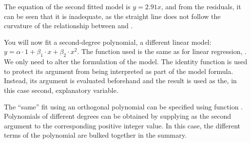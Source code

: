 \documentclass[krantz2]{krantz}\usepackage{knitr}
\begin{document}
The equation of the second fitted model is $y = 2.91 x$, and from the residuals, it can be seen that it is inadequate, as the straight line does not follow the curvature of the relationship between  and .
\begin{playground}
You will now fit a second-degree polynomial, a different linear model: $y = \alpha \cdot 1 + \beta_1 \cdot x + \beta_2 \cdot x^2$. The function used is the same as for linear regression, . We only need to alter the formulation of the model. The identity function  is used to protect its argument from being interpreted as part of the model formula. Instead, its argument is evaluated beforehand and the result is used as the, in this case second, explanatory variable.

\begin{knitrout}\footnotesize
{}\color{fgcolor}\begin{kframe}
\begin{alltt}
 \hlkwb{<-}  \hlopt{~}  \hlopt{+} \hlopt{^}\hlstd{),}  
  \hlstd{=} \hlstd{)}
\end{alltt}
\end{kframe}
\end{knitrout}

The ``same'' fit using an orthogonal polynomial can be specified using function . Polynomials of different degrees can be obtained by supplying as the second argument to  the corresponding positive integer value. In this case, the different terms of the polynomial are bulked together in the summary.

\begin{knitrout}\footnotesize
{}\color{fgcolor}\begin{kframe}
\begin{alltt}
 \hlkwb{<-}  \hlopt{~}  \hlstd{),}  
\end{alltt}
\end{kframe}
\end{knitrout}


\end{playground}
\end{document}
